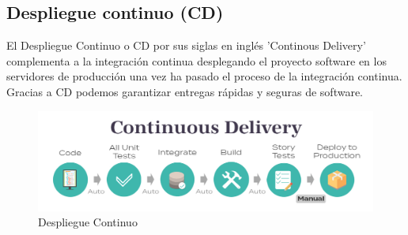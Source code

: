 	\subsection{Despliegue continuo (CD)}
		\begin{text}
			El Despliegue Continuo o CD por sus siglas en inglés 'Continous Delivery' complementa a la integración continua desplegando el proyecto software en los servidores de producción una vez ha pasado el proceso de la integración continua. Gracias a CD podemos garantizar entregas rápidas y seguras de software.
			
			\begin{figure}[!hbt]
				\centering
				\includegraphics[scale=0.35]{imagenes/Introduccion/Conceptos_Basicos/CD.png}
				\caption[Despliegue Continuo]{Despliegue Continuo \cite{continuo84:online}}
				\label{despligue_continuo} 
			\end{figure}
		\end{text}
